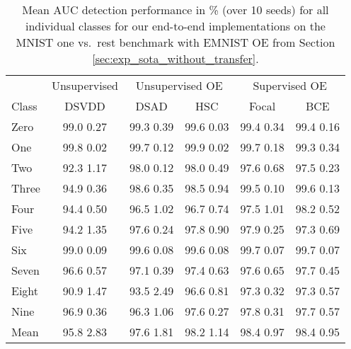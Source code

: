 \documentclass[10pt]{article} \usepackage[accepted]{stylefiles/tmlr}
\begin{document}
\begin{table*}[th]
    \caption{Mean AUC detection performance in \% (over 10 seeds) for all individual classes for our end-to-end implementations on the MNIST one vs.~rest benchmark with EMNIST OE from Section \ref{sec:exp_sota_without_transfer}. }
    \label{tab:mnist_one_vs_rest_wo_transfer}
    \vspace{0.5em}
    \centering\footnotesize
    
\begin{tabular}{lccccc}
\toprule
& \multicolumn{1}{c|}{Unsupervised} & \multicolumn{2}{c|}{Unsupervised OE} & \multicolumn{2}{c}{Supervised OE} \\
Class &   \multicolumn{1}{c|}{DSVDD} & DSAD & \multicolumn{1}{c|}{HSC} & Focal & \multicolumn{1}{c}{BCE} \\
\midrule
Zero & \multicolumn{1}{c|}{99.0  0.27} & 99.3  0.39 & \multicolumn{1}{c|}{99.6  0.03} & 99.4  0.34 & \multicolumn{1}{c}{99.4  0.16} \\
One & \multicolumn{1}{c|}{99.8  0.02} & 99.7  0.12 & \multicolumn{1}{c|}{99.9  0.02} & 99.7  0.18 & \multicolumn{1}{c}{99.3  0.34} \\
Two & \multicolumn{1}{c|}{92.3  1.17} & 98.0  0.12 & \multicolumn{1}{c|}{98.0  0.49} & 97.6  0.68 & \multicolumn{1}{c}{97.5  0.23} \\
Three & \multicolumn{1}{c|}{94.9  0.36} & 98.6  0.35 & \multicolumn{1}{c|}{98.5  0.94} & 99.5  0.10 & \multicolumn{1}{c}{99.6  0.13} \\
Four & \multicolumn{1}{c|}{94.4  0.50} & 96.5  1.02 & \multicolumn{1}{c|}{96.7  0.74} & 97.5  1.01 & \multicolumn{1}{c}{98.2  0.52} \\
Five & \multicolumn{1}{c|}{94.2  1.35} & 97.6  0.24 & \multicolumn{1}{c|}{97.8  0.90} & 97.9  0.25 & \multicolumn{1}{c}{97.3  0.69} \\
Six & \multicolumn{1}{c|}{99.0  0.09} & 99.6  0.08 & \multicolumn{1}{c|}{99.6  0.08} & 99.7  0.07 & \multicolumn{1}{c}{99.7  0.07} \\
Seven & \multicolumn{1}{c|}{96.6  0.57} & 97.1  0.39 & \multicolumn{1}{c|}{97.4  0.63} & 97.6  0.65 & \multicolumn{1}{c}{97.7  0.45} \\
Eight & \multicolumn{1}{c|}{90.9  1.47} & 93.5  2.49 & \multicolumn{1}{c|}{96.6  0.81} & 97.3  0.32 & \multicolumn{1}{c}{97.3  0.57} \\
Nine & \multicolumn{1}{c|}{96.9  0.36} & 96.3  1.06 & \multicolumn{1}{c|}{97.6  0.27} & 97.8  0.31 & \multicolumn{1}{c}{97.7  0.57} \\
\midrule
Mean & \multicolumn{1}{c|}{95.8  2.83} & 97.6  1.81 & \multicolumn{1}{c|}{98.2  1.14} & 98.4  0.97 & \multicolumn{1}{c}{98.4  0.95} \\
\bottomrule
\end{tabular}
     \end{table*}
\end{document}
